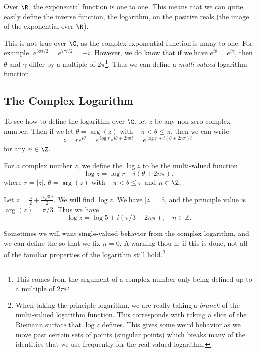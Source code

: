 Over $\R$, the exponential function is one to one. This means that we can quite easily define the inverse function, the logarithm, on the positive reals (the image of the exponential over $\R$).

This is not true over $\C$, as the complex exponential function is many to one. For example, $e^{3\pi i/2} = e^{7 \pi i/2} = -i$. However, we do know that if we have $e^{i\theta} = e^{i \gamma}$, then $\theta$ and $\gamma$ differ by a multiple of $2 \pi$\footnote{This comes from the argument of a complex number only being defined up to a multiple of $2\pi$}. Thus we can define a \emph{multi-valued} logarithm function.

\subsection{The Complex Logarithm}

To see how to define the logarithm over $\C$, let $z$ be any non-zero complex number. Then if we let $\theta = \arg(z)$ with $-\pi < \theta \leq \pi$, then we can write
$$
z = re^{i \theta} =  e^{\log r} e^{i \theta + 2n \pi i} = e^{\log r + i(\theta + 2n \pi)i},
$$
for any $n \in \Z$.

\begin{definition}
	For a complex number $z$, we define the  $\log z$ to be the multi-valued function
	$$
	\log z = \log r + i(\theta + 2n\pi),
	$$
	where $r = |z|$, $\theta = \arg (z)$ with $- \pi < \theta \leq \pi$ and $n \in \Z$.
\end{definition}

\begin{example}
	Let $z = \frac{5}{2} + \frac{5\sqrt{3} i}{2}$. We will find $\log z$. We have $|z| = 5$, and the principle value is $\arg(z) = \pi/3$. Thus we have
	$$
	\log z = \log 5 + i (\pi/3 + 2n \pi), \quad n \in \mathbb{Z}.
	$$
\end{example}

Sometimes we will want single-valued behavior from the complex logarithm, and we can define the  so that we fix $n = 0$. A warning thou h: if this is done, not all of the familiar properties of the logarithm still hold.\footnote{When taking the principle logarithm, we are really taking a \emph{branch} of the multi-valued logarithm function. This corresponds with taking a slice of the Riemann surface that $\log z$ defines. This gives some weird behavior as we move past certain sets of points (singular points) which breaks many of the identities that we use frequently for the real valued logarithm.}

